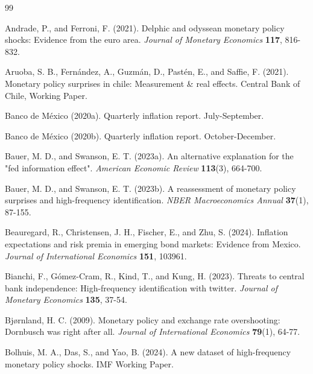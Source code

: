 \documentclass[12pt, reqno]{article}
\begin{document}
\label{sec:conclusion}


\newpage

\begin{thebibliography}{99}


\bibitem{} \hypertarget{Andrade and Ferroni (2021)}{} Andrade, P., and Ferroni, F. (2021). Delphic and odyssean monetary policy shocks: Evidence from the euro area. \textit{Journal of Monetary Economics} \textbf{117}, 816-832.

\bibitem{} \hypertarget{Aruoba et al. (2021)}{} 
Aruoba, S. B., Fernández, A., Guzmán, D., Pastén, E., and Saffie, F. (2021). Monetary policy surprises in chile: Measurement \& real effects. Central Bank of Chile, Working Paper.

\bibitem{} \hypertarget{Bancoa}{} Banco de México (2020a). Quarterly inflation report. July-September.

\bibitem{} \hypertarget{Bancoa}{} Banco de México (2020b). Quarterly inflation report. October-December.

\bibitem{} \hypertarget{Bauer and Swanson (2023a)}{} 
Bauer, M. D., and Swanson, E. T. (2023a). An alternative explanation for the "fed information effect". \textit{American Economic Review} \textbf{113}(3), 664-700.

\bibitem{} \hypertarget{Bauer and Swanson (2023b)}{} 
Bauer, M. D., and Swanson, E. T. (2023b). A reassessment of monetary policy surprises and high-frequency identification. \textit{NBER Macroeconomics Annual} \textbf{37}(1), 87-155.

\bibitem{} \hypertarget{Beauregard et al. (2024)}{}Beauregard, R., Christensen, J. H., Fischer, E., and Zhu, S. (2024). Inflation expectations and risk premia in emerging bond markets: Evidence from Mexico. \textit{Journal of International Economics} \textbf{151}, 103961.

\bibitem{} \hypertarget{Bianchi et al. (2023)}{} 
Bianchi, F., Gómez-Cram, R., Kind, T., and Kung, H. (2023). Threats to central bank independence: High-frequency identification with twitter. \textit{Journal of Monetary Economics} \textbf{135}, 37-54.

\bibitem{} \hypertarget{Bjørnland (2009)}{}Bjørnland, H. C. (2009). Monetary policy and exchange rate overshooting: Dornbusch was right after all. \textit{Journal of International Economics} \textbf{79}(1), 64-77.

\bibitem{} \hypertarget{Bolhuis et al. (2024)}{} 
Bolhuis, M. A., Das, S., and Yao, B. (2024). A new dataset of high-frequency monetary policy shocks. IMF Working Paper.


\end{thebibliography}
\end{document}
